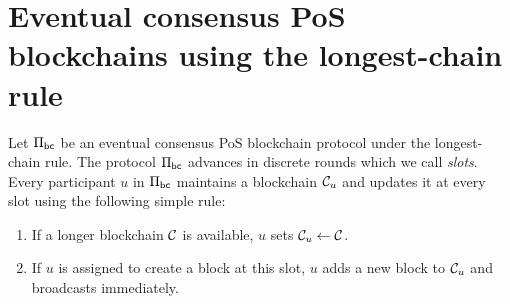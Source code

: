 \section{Eventual consensus PoS blockchains using the longest-chain rule}
    Let $\Pi_\mathsf{bc}$ be an eventual consensus PoS blockchain protocol 
    under the longest-chain rule. 
    The protocol $\Pi_\mathsf{bc}$ advances in discrete rounds 
    which we call \emph{slots}.
    Every participant $u$ in $\Pi_\mathsf{bc}$ 
    maintains a blockchain $\mathcal{C}_u$ 
    and updates it at every slot using the following simple rule: 
    \begin{enumerate}
      \item If a longer blockchain $\mathcal{C}$ is available, 
      $u$ sets $\mathcal{C}_u \leftarrow \mathcal{C}$.

      \item If $u$ is assigned to create a block at this slot, 
      $u$ adds a new block to $\mathcal{C}_u$ and broadcasts immediately.
    \end{enumerate}



